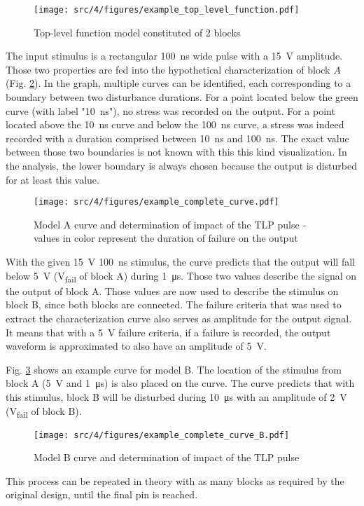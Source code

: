 \begin{figure}[!h]
  \centering
  \texttt{[image: src/4/figures/example\_top\_level\_function.pdf]}
  \caption{Top-level function model constituted of 2 blocks}
  \label{example_toplevel_function}
\end{figure}

The input stimulus is a rectangular \SI{100}{\nano\second} wide pulse with a \SI{15}{\volt} amplitude.
Those two properties are fed into the hypothetical characterization of block $A$ (Fig. \ref{example_complete_curve}).
In the graph, multiple curves can be identified, each corresponding to a boundary between two disturbance durations.
For a point located below the green curve (with label "\SI{10}{\nano\second}"), no stress was recorded on the output.
For a point located above the \SI{10}{\nano\second} curve and below the \SI{100}{\nano\second} curve, a stress was indeed recorded with a duration comprised between \SI{10}{\nano\second} and \SI{100}{\nano\second}.
The exact value between those two boundaries is not known with this this kind visualization.
In the analysis, the lower boundary is always chosen because the output is disturbed for at least this value.

\begin{figure}[!h]
  \centering
  \texttt{[image: src/4/figures/example\_complete\_curve.pdf]}
  \caption{Model A curve and determination of impact of the TLP pulse - values in color represent the duration of failure on the output}
  \label{example_complete_curve}
\end{figure}

With the given \SI{15}{\volt} \SI{100}{\nano\second} stimulus, the curve predicts that the output will fall below \SI{5}{\volt} (V\textsubscript{fail} of block A) during \SI{1}{\micro\second}.
Those two values describe the signal on the output of block A.
Those values are now used to describe the stimulus on block B, since both blocks are connected.
The failure criteria that was used to extract the characterization curve also serves as amplitude for the output signal.
It means that with a \SI{5}{\volt} failure criteria, if a failure is recorded, the output waveform is approximated to also have an amplitude of \SI{5}{\volt}.

Fig. \ref{example_complete_curve_B} shows an example curve for model B.
The location of the stimulus from block A (\SI{5}{\volt} and \SI{1}{\micro\second}) is also placed on the curve.
The curve predicts that with this stimulus, block B will be disturbed during \SI{10}{\micro\second} with an amplitude of \SI{2}{\volt} (V\textsubscript{fail} of block B).

\begin{figure}[!h]
  \centering
  \texttt{[image: src/4/figures/example\_complete\_curve\_B.pdf]}
  \caption{Model B curve and determination of impact of the TLP pulse}
  \label{example_complete_curve_B}
\end{figure}

This process can be repeated in theory with as many blocks as required by the original design, until the final pin is reached.
